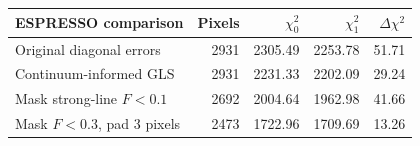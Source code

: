 \begin{tabular}{lrrrr}
\hline
ESPRESSO comparison & Pixels & $\chi^2_0$ & $\chi^2_1$ & $\Delta\chi^2$ \\
\hline
Original diagonal errors & 2931 & 2305.49 & 2253.78 & 51.71 \\
Continuum-informed GLS & 2931 & 2231.33 & 2202.09 & 29.24 \\
Mask strong-line $F<0.1$ & 2692 & 2004.64 & 1962.98 & 41.66 \\
Mask $F<0.3$, pad 3 pixels & 2473 & 1722.96 & 1709.69 & 13.26 \\
\hline
\end{tabular}
